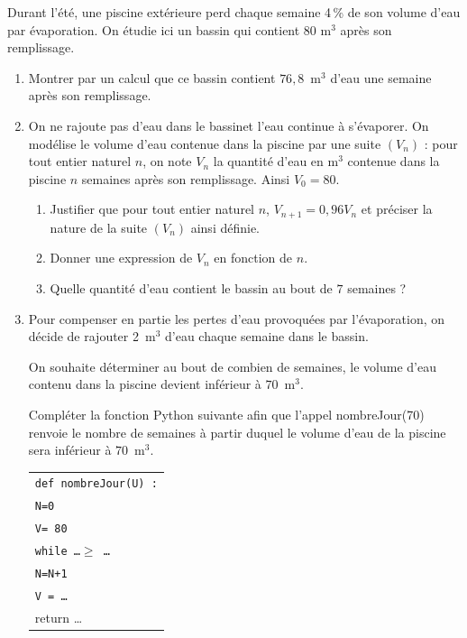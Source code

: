 \medskip

Durant l'été, une piscine extérieure perd chaque semaine 4\,\% de son volume d'eau par évaporation. On étudie ici un bassin qui contient 80 m$^3$ après son remplissage.

\medskip

\begin{enumerate}
\item Montrer par un calcul que ce bassin contient $76,8$~m$^3$ d'eau une semaine après son remplissage.
\item  On ne rajoute pas d'eau dans le bassinet l'eau continue à s'évaporer. On modélise le volume d'eau contenue dans la piscine par une suite $\left(V_n\right)$ : pour tout entier naturel $n$, on note $V_n$ la quantité d'eau en m$^3$ contenue dans la piscine $n$ semaines après son remplissage. Ainsi
$V_0 = 80$.
	\begin{enumerate}
		\item Justifier que pour tout entier naturel $n$,\: $V_{n+1} = 0,96 V_n$ et préciser la nature de la suite $\left(V_n\right)$ ainsi définie.
		\item Donner une expression de $V_n$ en fonction de $n$.
		\item Quelle quantité d'eau contient le bassin au bout de $7$ semaines ?
	\end{enumerate}
\item  Pour compenser en partie les pertes d'eau provoquées par l'évaporation, on décide de rajouter 2~m$^3$ d'eau chaque semaine dans le bassin. 

On souhaite déterminer au bout de combien de semaines, le volume d'eau contenu dans la piscine devient inférieur à $70$~m$^3$. 

Compléter la fonction Python suivante afin que l'appel nombreJour(70) renvoie le nombre de semaines à partir duquel le volume d'eau de la piscine sera inférieur à $70$~m$^3$.

\begin{center}
\begin{tabularx}{0.4\linewidth}{|X|}\hline
\texttt{def nombreJour(U) :}\\
\quad \texttt{N=0}\\
\quad \texttt{V= 80}\\
\quad \texttt{while \ldots  $\geqslant$ \ldots}\\
\qquad \texttt{N=N+1}\\
\qquad \texttt{V = \ldots}\\
\quad return \ldots\\ \hline
\end{tabularx}
\end{center}
\end{enumerate}

\bigskip
